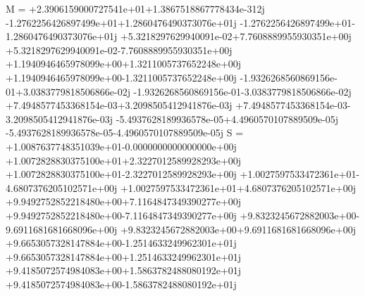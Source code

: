 M =
+2.3906159000727541e+01+1.3867518867778434e-312j
-1.2762256426897499e+01+1.2860476490373076e+01j
-1.2762256426897499e+01-1.2860476490373076e+01j
+5.3218297629940091e-02+7.7608889955930351e+00j
+5.3218297629940091e-02-7.7608889955930351e+00j
+1.1940946465978099e+00+1.3211005737652248e+00j
+1.1940946465978099e+00-1.3211005737652248e+00j
-1.9326268560869156e-01+3.0383779818506866e-02j
-1.9326268560869156e-01-3.0383779818506866e-02j
+7.4948577453368154e-03+3.2098505412941876e-03j
+7.4948577453368154e-03-3.2098505412941876e-03j
-5.4937628189936578e-05+4.4960570107889509e-05j
-5.4937628189936578e-05-4.4960570107889509e-05j
S =
+1.0087637748351039e+01-0.0000000000000000e+00j
+1.0072828830375100e+01+2.3227012589928293e+00j
+1.0072828830375100e+01-2.3227012589928293e+00j
+1.0027597533472361e+01-4.6807376205102571e+00j
+1.0027597533472361e+01+4.6807376205102571e+00j
+9.9492752852218480e+00+7.1164847349390277e+00j
+9.9492752852218480e+00-7.1164847349390277e+00j
+9.8323245672882003e+00-9.6911681681668096e+00j
+9.8323245672882003e+00+9.6911681681668096e+00j
+9.6653057328147884e+00-1.2514633249962301e+01j
+9.6653057328147884e+00+1.2514633249962301e+01j
+9.4185072574984083e+00+1.5863782488080192e+01j
+9.4185072574984083e+00-1.5863782488080192e+01j



